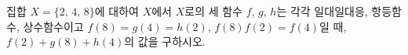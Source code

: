 집합 $X=\{2,\,4,\,8\}$에 대하여 $X$에서 $X$로의 세 함수 $f$, $g$, $h$는 각각 일대일대응, 항등함수, 상수함수이고 $f(8)=g(4)=h(2)$, $f(8)f(2)=f(4)$일 때, $f(2)+g(8)+h(4)$의 값을 구하시오.
